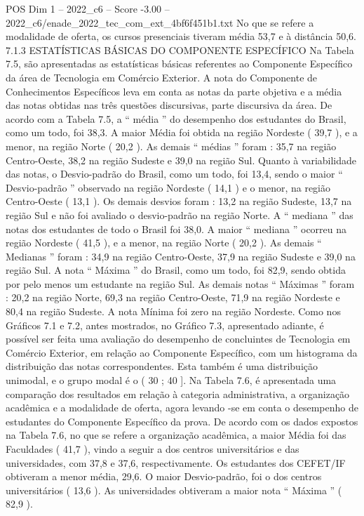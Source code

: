 \begin{textsample}{POS Dim 1 – 2022\_c6 – Score -3.00 – 2022\_c6/enade\_2022\_tec\_com\_ext\_4bf6f451b1.txt}
No que se refere a modalidade de oferta, os cursos presenciais tiveram média 53,7 e à distância 50,6. 7.1.3 ESTATÍSTICAS BÁSICAS DO COMPONENTE ESPECÍFICO Na Tabela 7.5, são apresentadas as estatísticas básicas referentes ao Componente Específico da área de Tecnologia em Comércio Exterior.
A nota do Componente de Conhecimentos Específicos leva em conta as notas da parte objetiva e a média das notas obtidas nas três questões discursivas, parte discursiva da área.
De acordo com a Tabela 7.5, a “ média ” do desempenho dos estudantes do Brasil, como um todo, foi 38,3.
A maior Média foi obtida na região Nordeste ( 39,7 ), e a menor, na região Norte ( 20,2 ).
As demais “ médias ” foram : 35,7 na região Centro-Oeste, 38,2 na região Sudeste e 39,0 na região Sul.
Quanto à variabilidade das notas, o Desvio-padrão do Brasil, como um todo, foi 13,4, sendo o maior “ Desvio-padrão ” observado na região Nordeste ( 14,1 ) e o menor, na região Centro-Oeste ( 13,1 ).
Os demais desvios foram : 13,2 na região Sudeste, 13,7 na região Sul e não foi avaliado o desvio-padrão na região Norte.
A “ mediana ” das notas dos estudantes de todo o Brasil foi 38,0.
A maior “ mediana ” ocorreu na região Nordeste ( 41,5 ), e a menor, na região Norte ( 20,2 ).
As demais “ Medianas ” foram : 34,9 na região Centro-Oeste, 37,9 na região Sudeste e 39,0 na região Sul.
A nota “ Máxima ” do Brasil, como um todo, foi 82,9, sendo obtida por pelo menos um estudante na região Sul.
As demais notas “ Máximas ” foram : 20,2 na região Norte, 69,3 na região Centro-Oeste, 71,9 na região Nordeste e 80,4 na região Sudeste.
A nota Mínima foi zero na região Nordeste.
Como nos Gráficos 7.1 e 7.2, antes mostrados, no Gráfico 7.3, apresentado adiante, é possível ser feita uma avaliação do desempenho de concluintes de Tecnologia em Comércio Exterior, em relação ao Componente Específico, com um histograma da distribuição das notas correspondentes.
Esta também é uma distribuição unimodal, e o grupo modal é o ( 30 ; 40 ].
Na Tabela 7.6, é apresentada uma comparação dos resultados em relação à categoria administrativa, a organização acadêmica e a modalidade de oferta, agora levando -se em conta o desempenho de estudantes do Componente Específico da prova.
De acordo com os dados expostos na Tabela 7.6, no que se refere a organização acadêmica, a maior Média foi das Faculdades ( 41,7 ), vindo a seguir a dos centros universitários e das universidades, com 37,8 e 37,6, respectivamente.
Os estudantes dos CEFET/IF obtiveram a menor média, 29,6.
O maior Desvio-padrão, foi o dos centros universitários ( 13,6 ).
As universidades obtiveram a maior nota “ Máxima ” ( 82,9 ).

\end{textsample}
